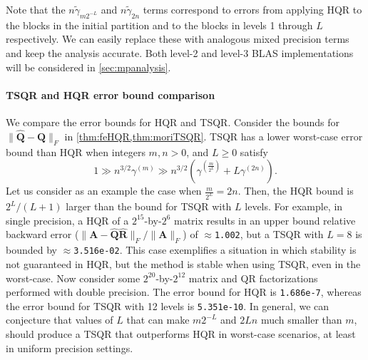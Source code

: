 \documentclass[review,onefignum,onetabnum]{siamart190516}
\newcommand{\bb}[1]{\mathbf{#1}}
\begin{document}
Note that the $n\tilde{\gamma}_{m2^{-L}}$ and $n\tilde{\gamma}_{ 2n}$ terms correspond to errors from applying HQR to the blocks in the initial partition and to the blocks in levels 1 through $L$ respectively.
We can easily replace these with analogous mixed precision terms and keep the analysis accurate.
Both level-2 and level-3 BLAS implementations will be considered in \cref{sec:mpanalysis}.
\paragraph{TSQR and HQR error bound comparison}
We compare the error bounds for HQR and TSQR. 
Consider the bounds for $\|\hat{\bb{Q}}-\bb{Q}\|_F$ in \cref{thm:feHQR,thm:moriTSQR}.
TSQR has a lower worst-case error bound than HQR when integers $m, n > 0$, and $L\geq0$ satisfy
\begin{equation*}
1\gg n^{3/2}\gamma^{(m)} \gg n^{3/2}(\gamma^{(\frac{m}{2^L})}+L\gamma^{(2n)}).
\end{equation*}
Let us consider as an example the case when $\frac{m}{2^L}=2n$.
Then, the HQR bound is $2^L/(L+1)$ larger than the bound for TSQR with $L$ levels. 
For example, in single precision, a HQR of a $2^{15}$-by-$2^6$ matrix results in an upper bound relative backward error ($\|\bb{A}-\hat{\bb{Q}}\hat{\bb{R}}\|_F/\|\bb{A}\|_F$) of $\approx${\tt1.002}, but a TSQR with $L=8$ is bounded by $\approx${\tt 3.516e-02}. 
This case exemplifies a situation in which stability is not guaranteed in HQR, but the method is stable when using TSQR, even in the worst-case. 
Now consider some $2^{20}$-by-$2^{12}$ matrix and QR factorizations performed with double precision.
The error bound for HQR is {\tt 1.686e-7}, whereas the error bound for TSQR with 12 levels is {\tt 5.351e-10}.
In general, we can conjecture that values of $L$ that can make $m2^{-L}$ and $2Ln$ much smaller than $m$, should produce a TSQR that outperforms HQR in worst-case scenarios, at least in uniform precision settings.
\end{document}
